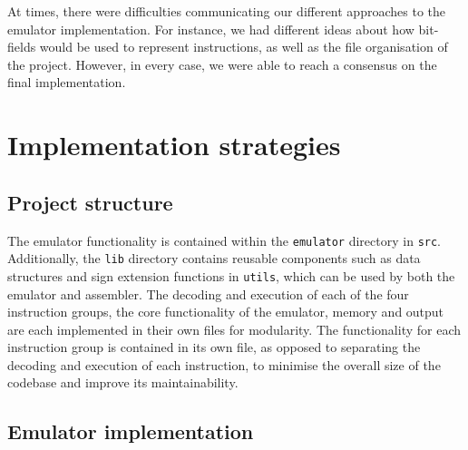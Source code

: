 \documentclass[11pt]{article}
\begin{document}
At times, there were difficulties communicating our different approaches to the emulator implementation. For instance, we had different ideas about how bit-fields would be used to represent instructions, as well as the file organisation of the project. However, in every case, we were able to reach a consensus on the final implementation.

\section{Implementation strategies}

\subsection{Project structure}

 The emulator functionality is contained within the \texttt{emulator} directory in \texttt{src}. Additionally, the \texttt{lib} directory contains reusable components such as data structures and sign extension functions in \texttt{utils}, which can be used by both the emulator and assembler. The decoding and execution of each of the four instruction groups, the core functionality of the emulator, memory and output are each implemented in their own files for modularity. The functionality for each instruction group is contained in its own file, as opposed to separating the decoding and execution of each instruction, to minimise the overall size of the codebase and improve its maintainability.



\subsection{Emulator implementation}
\end{document}
